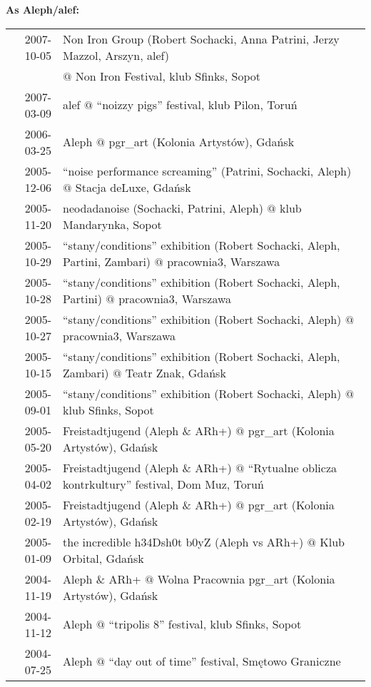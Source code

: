 \documentclass[a4paper]{article}
\begin{document}
\vspace{11mm}

\textbf{As Aleph/alef:}

\vspace{2mm}

\begin{tabularx}{\textwidth}{r l}
\hline
2007-10-05 & Non Iron Group (Robert Sochacki, Anna Patrini, Jerzy Mazzol, Arszyn, alef)\\
           & $@$ Non Iron Festival, klub Sfinks, Sopot\\
\hline
2007-03-09 & alef $@$ ``noizzy pigs'' festival, klub Pilon, Toruń\\
\hline
2006-03-25 & Aleph $@$ pgr\_art (Kolonia Artystów), Gdańsk\\
\hline
2005-12-06 & ``noise performance screaming'' (Patrini, Sochacki, Aleph) $@$ Stacja deLuxe, Gdańsk\\
\hline
2005-11-20 & neodadanoise (Sochacki, Patrini, Aleph) $@$ klub Mandarynka, Sopot\\
\hline
2005-10-29 & ``stany/conditions'' exhibition (Robert Sochacki, Aleph, Partini, Zambari) $@$ pracownia3, Warszawa\\
\hline
2005-10-28 & ``stany/conditions'' exhibition (Robert Sochacki, Aleph, Partini) $@$  pracownia3, Warszawa\\
\hline
2005-10-27 & ``stany/conditions'' exhibition (Robert Sochacki, Aleph) $@$ pracownia3, Warszawa\\
\hline
2005-10-15 & ``stany/conditions'' exhibition (Robert Sochacki, Aleph, Zambari) $@$  Teatr Znak, Gdańsk\\
\hline
2005-09-01 & ``stany/conditions'' exhibition (Robert Sochacki, Aleph) $@$ klub Sfinks, Sopot\\
\hline
2005-05-20 & Freistadtjugend (Aleph \& ARh+) $@$ pgr\_art (Kolonia Artystów),  Gdańsk\\
\hline
2005-04-02 & Freistadtjugend (Aleph \& ARh+) $@$ ``Rytualne oblicza kontrkultury'' festival, Dom Muz, Toruń\\
\hline
2005-02-19 & Freistadtjugend (Aleph \& ARh+) $@$ pgr\_art (Kolonia Artystów),  Gdańsk\\
\hline
2005-01-09 & the incredible h34Dsh0t b0yZ (Aleph vs ARh+) $@$ Klub Orbital, Gdańsk\\
\hline
2004-11-19 & Aleph \& ARh+ $@$ Wolna Pracownia pgr\_art (Kolonia Artystów), Gdańsk\\
\hline
2004-11-12 & Aleph $@$ ``tripolis 8'' festival, klub Sfinks, Sopot\\
\hline
2004-07-25 & Aleph $@$ ``day out of time'' festival, Smętowo Graniczne\\
\end{tabularx}
\end{document}
